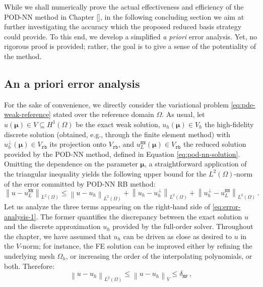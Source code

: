 \documentclass[12pt, a4paper, twoside, openright]{report}
\numberwithin{equation}{chapter}
\theoremstyle{theorem}
\theoremstyle{definition}
\theoremstyle{remark}
\theoremstyle{proposition}
\numberwithin{figure}{chapter}
\newcommand{\norm}[1]{\left\lVert#1\right\rVert}
\newcommand{\bg}[1]{\boldsymbol{#1}}
\begin{document}
		\algrenewcommand\textproc{\textsc}
		
		While we shall numerically prove the actual effectiveness and efficiency of the POD-NN method in Chapter \ref{}, in the following concluding section we aim at further investigating the accuracy which the proposed reduced basis strategy could provide. To this end, we develop a simplified \emph{a priori} error analysis. Yet, no rigorous proof is provided; rather, the goal is to give a sense of the potentiality of the method.
		
	\subsection{An a priori error analysis}
	\label{section:An a priori error analysis}
	
		For the sake of convenience, we directly consider the variational problem \eqref{eq:pde-weak-reference} stated over the reference domain $\Omega$. As usual, let $u(\bg{\mu}) \in V \subseteq H^1(\Omega)$ be the exact weak solution, $u_h(\bg{\mu}) \in V_h$ the high-fidelity discrete solution (obtained, e.g., through the finite element method) with $u_h^{\perp}(\bg{\mu}) \in V_{\texttt{rb}}$ its projection onto $V_{\texttt{rb}}$, and $u_L^{\texttt{NN}}(\bg{\mu}) \in V_{\texttt{rb}}$ the reduced solution provided by the POD-NN method, defined in Equation \eqref{eq:pod-nn-solution}. Omitting the dependence on the parameter $\bg{\mu}$, a straightforward application of the triangular inequality yields the following upper bound for the $L^2(\Omega)$-norm of the error committed by POD-NN RB method:
		\begin{equation}
			\label{eq:error-analysis-1}
			\norm{u - u_L^{\texttt{NN}}}_{L^2(\Omega)} \leq \norm{u - u_h}_{L^2(\Omega)} + \norm{u_h - u_h^{\perp}}_{L^2(\Omega)} + \norm{u_h^{\perp} - u_L^{\texttt{NN}}}_{L^2(\Omega)} \, .
		\end{equation}
		Let us analyze the three terms appearing on the right-hand side of \eqref{eq:error-analysis-1}. The former quantifies the discrepancy between the exact solution $u$ and the discrete approximation $u_h$ provided by the full-order solver. Throughout the chapter, we have assumed that $u_h$ can be driven as close as desired to $u$ in the $V$-norm; for instance, the FE solution can be improved either by refining the underlying mesh $\Omega_h$, or increasing the order of the interpolating polynomials, or both. Therefore:
		\begin{equation}
			\label{eq:error-analysis-2}
			\norm{u - u_h}_{L^2(\Omega)} \leq \norm{u - u_h}_V \leq \delta_{\texttt{HF}} \, ,
		\end{equation} 
\end{document}
